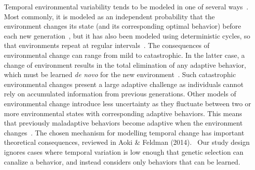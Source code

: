 \documentclass[letterpaper,11.5pt]{scrartcl}
\begin{document}
Temporal environmental variability tends to be modeled in one of 
several ways~\citep{aoki2014evolution}. Most commonly, it is modeled
as an independent probability that the environment changes its state (and its corresponding optimal behavior) before each new generation~\citep{BoydRicherson1985,Rogers1988,Feldman1996,McElreath2005,Enquist2007,perreault2012bayesian,aoki2014evolution}, but
it has also been modeled using deterministic cycles, so that environments repeat at regular intervals~\citep{Feldman1996, aoki2014evolution}.
The consequences of environmental change can range from mild to catastrophic. In the latter case, a change of environment results in the total elimination of any adaptive behavior, which must be learned \emph{de novo} for the new environment~\citep{Rogers1988}. Such catastrophic environmental changes present
a large adaptive challenge as individuals cannot rely on accumulated information
from previous generations. Other models of environmental change introduce less
uncertainty as they fluctuate between two or more environmental states with corresponding adaptive behaviors. This means that previously maladaptive
behaviors become adaptive when the environment changes~\citep{perreault2012bayesian}. The chosen mechanism for modelling temporal change has important theoretical consequences, reviewed in Aoki \& Feldman (2014).~\nocite{aoki2014evolution} Our study design ignores cases where temporal variation is low enough that genetic selection can canalize a behavior, and instead considers only behaviors that can be learned.
\end{document}
